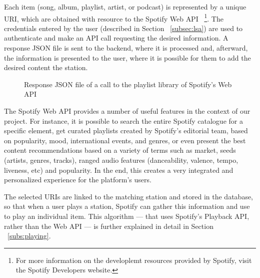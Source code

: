 Each item (song, album, playlist, artist, or podcast) is represented by a unique \ac{URI}, which are obtained with resource to the Spotify Web \ac{API} ~\footnote{For more information on the developlemt resources provided by Spotify, visit the Spotify Developers website.}. The credentials entered by the user (described in Section ~\ref{subsec:lsa}) are used to authenticate and make an API call requesting the desired information. A response JSON file is sent to the backend, where it is processed and, afterward, the information is presented to the user, where it is possible for them to add the desired content the station.

\begin{figure}[h]
\centering
{}
\caption{Response JSON file of a call to the playlist library of Spotify's Web API}
\label{fig:mys}
\end{figure}


The Spotify Web \ac{API} provides a number of useful features in the context of our project. For instance, it is possible to search the entire Spotify catalogue for a specific element, get curated playlists created by Spotify’s editorial team, based on popularity, mood, international events, and genres, or even present the best content recommendations based on a variety of terms such as market, seeds (artists, genres, tracks), ranged audio features (danceability, valence, tempo, liveness, etc) and popularity. In the end, this creates a very integrated and personalized experience for the platform's users.

The selected \acp{URI} are linked to the matching station and stored in the database, so that when a user plays a station, Spotify can gather this information and use to play an individual item. This algorithm — that uses Spotify's Playback \ac{API}, rather than the Web \ac{API} — is further explained in detail in Section ~\ref{subs:playing}.
\newpage

